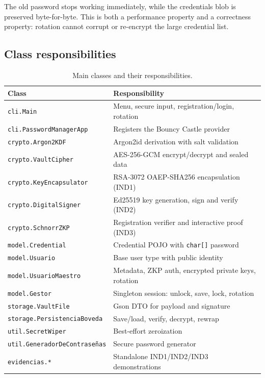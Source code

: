 \documentclass[11pt,a4paper]{article}
\newcommand{\code}[1]{\texttt{#1}}
\begin{document}
The old password stops working immediately, while the credentials blob is
preserved byte-for-byte. This is both a performance property and a correctness
property: rotation cannot corrupt or re-encrypt the large credential list.

\subsection{Class responsibilities}

\begin{table}[htbp]
\centering
\small
\begin{tabular}{@{}p{4.5cm}p{9.7cm}@{}}
\toprule
\textbf{Class} & \textbf{Responsibility} \\
\midrule
\code{cli.Main} & Menu, secure input, registration/login, rotation \\
\code{cli.PasswordManagerApp} & Registers the Bouncy Castle provider \\
\code{crypto.Argon2KDF} & Argon2id derivation with salt validation \\
\code{crypto.VaultCipher} & AES-256-GCM encrypt/decrypt and sealed data \\
\code{crypto.KeyEncapsulator} & RSA-3072 OAEP-SHA256 encapsulation (IND1) \\
\code{crypto.DigitalSigner} & Ed25519 key generation, sign and verify (IND2) \\
\code{crypto.SchnorrZKP} & Registration verifier and interactive proof (IND3) \\
\code{model.Credential} & Credential POJO with \code{char[]} password \\
\code{model.Usuario} & Base user type with public identity \\
\code{model.UsuarioMaestro} & Metadata, ZKP auth, encrypted private keys, rotation \\
\code{model.Gestor} & Singleton session: unlock, save, lock, rotation \\
\code{storage.VaultFile} & Gson DTO for payload and signature \\
\code{storage.PersistenciaBoveda} & Save/load, verify, decrypt, rewrap \\
\code{util.SecretWiper} & Best-effort zeroization \\
\code{util.GeneradorDeContrase\~nas} & Secure password generator \\
\code{evidencias.*} & Standalone IND1/IND2/IND3 demonstrations \\
\bottomrule
\end{tabular}
\caption{Main classes and their responsibilities.}
\label{tab:classes}
\end{table}
\end{document}
